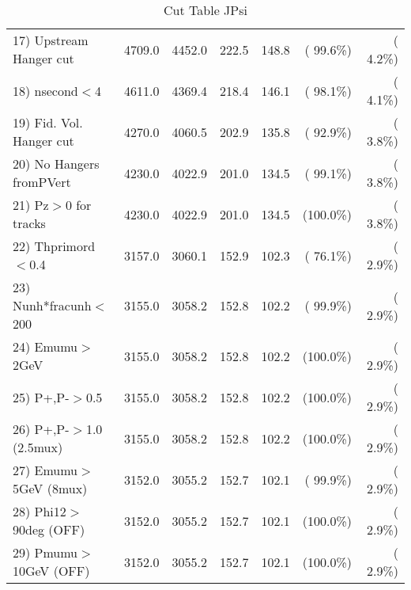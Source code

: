 \begin{table}[h!]
\begin{tabular}{||l||r|r|r|r|r|r||}
 17) Upstream Hanger cut  &       4709.0 &       4452.0 &        222.5 &        148.8 & ( 99.6\%) & (  4.2\%) \\
 18) nsecond$<$4          &       4611.0 &       4369.4 &        218.4 &        146.1 & ( 98.1\%) & (  4.1\%) \\
 19) Fid. Vol. Hanger cut &       4270.0 &       4060.5 &        202.9 &        135.8 & ( 92.9\%) & (  3.8\%) \\
 20) No Hangers fromPVert &       4230.0 &       4022.9 &        201.0 &        134.5 & ( 99.1\%) & (  3.8\%) \\
 21) Pz$>$0 for tracks    &       4230.0 &       4022.9 &        201.0 &        134.5 & (100.0\%) & (  3.8\%) \\
 22) Thprimord$<$0.4      &       3157.0 &       3060.1 &        152.9 &        102.3 & ( 76.1\%) & (  2.9\%) \\
 23) Nunh*fracunh$<$200   &       3155.0 &       3058.2 &        152.8 &        102.2 & ( 99.9\%) & (  2.9\%) \\
 24) Emumu$>$2GeV         &       3155.0 &       3058.2 &        152.8 &        102.2 & (100.0\%) & (  2.9\%) \\
 25) P+,P-$>$0.5          &       3155.0 &       3058.2 &        152.8 &        102.2 & (100.0\%) & (  2.9\%) \\
 26) P+,P-$>$1.0 (2.5mux) &       3155.0 &       3058.2 &        152.8 &        102.2 & (100.0\%) & (  2.9\%) \\
 27) Emumu$>$5GeV  (8mux) &       3152.0 &       3055.2 &        152.7 &        102.1 & ( 99.9\%) & (  2.9\%) \\
 28) Phi12$>$90deg  (OFF) &       3152.0 &       3055.2 &        152.7 &        102.1 & (100.0\%) & (  2.9\%) \\
 29) Pmumu$>$10GeV  (OFF) &       3152.0 &       3055.2 &        152.7 &        102.1 & (100.0\%) & (  2.9\%) \\
 \hline
 \hline
 \end{tabular}
 \caption{Cut Table  JPsi     }
 \label{tab-cutcohjpsi-mumu_cohrhop}
 \end{table}
